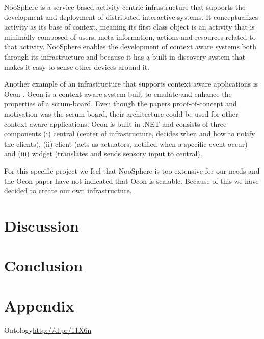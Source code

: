 \documentclass{sigchi}
\begin{document}
NooSphere \cite{houben2013noosphere} is a service based activity-centric infrastructure that supports the development and deployment of distributed interactive systems.
It conceptualizes activity as its base of context, meaning its first class object is an activity that is minimally composed of users, meta-information, actions and resources related to that activity.
NooSphere enables the development of context aware systems both through its infrastructure and because it has a built in discovery system that makes it easy to sense other devices around it.

Another example of an infrastructure that supports context aware applications is Ocon \cite{ocon}.
Ocon is a context aware system built to emulate and enhance the properties of a scrum-board.
Even though the papers proof-of-concept and motivation was the scrum-board, their architecture could be used for other context aware applications.
Ocon is built in .NET and consists of three components (i) central (center of infrastructure, decides when and how to notify the clients), (ii) client (acts as actuators, notified when a specific event occur) and (iii) widget (translates and sends sensory input to central).

For this specific project we feel that NooSphere is too extensive for our needs and the Ocon paper have not indicated that Ocon is scalable.
Because of this we have decided to create our own infrastructure.

\section{Discussion}

\section{Conclusion}

\balance



\section{Appendix}
Ontology\url{http://d.pr/11X6n}
\end{document}
